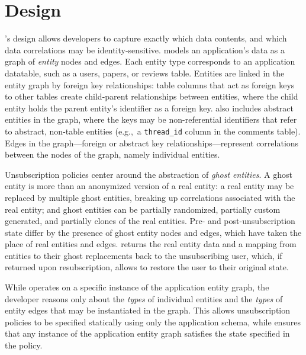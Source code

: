 \section{Design}
%

\sys's design allows developers to capture exactly which data contents, and which data correlations may be
identity-sensitive. \sys models an application's data as a graph of \emph{entity} nodes and edges.
Each entity type corresponds to an application datatable, such as a users, papers, or reviews table.
Entities are linked in the entity graph by foreign key relationships: table columns that act as
foreign keys to other tables create child-parent relationships between entities, where the child
entity holds the parent entity's identifier as a foreign key. \sys also includes
abstract entities in the graph, where the keys may be non-referential identifiers that refer to
abstract, non-table entities (e.g.,\ a \texttt{thread\_id} column in the comments table).  Edges in
the graph---foreign or abstract key relationships---represent correlations between the nodes of the
graph, namely individual entities.

Unsubscription policies center around the abstraction of \emph{ghost entities}. A ghost entity is
more than an anonymized version of a real entity: a real entity may be replaced by multiple ghost
entities, breaking up correlations associated with the real entity; and ghost entities can be
partially randomized, partially custom generated, and partially clones of the real entities. 
Pre- and post-unsubscription state differ by the presence of ghost entity nodes and edges, which
have taken the place of real entities and edges. \sys returns the real entity data and a mapping
from entities to their ghost replacements back to the unsubscribing user, which, if returned upon
resubscription, allows \sys to restore the user to their original state.

While \sys operates on a specific instance of the application entity graph, the developer reasons
only about the \emph{types} of individual entities and the \emph{types} of entity edges that may be
instantiated in the graph. This allows unsubscription policies to be specified statically using only
the application schema, while \sys ensures that any instance of the application entity graph
satisfies the state specified in the policy.

